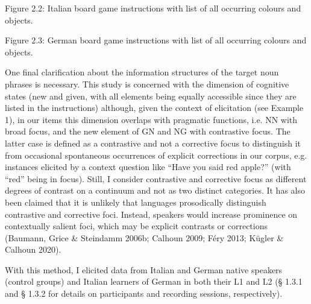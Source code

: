 \begin{stylecaption}
Figure 2.2: Italian board game instructions with list of all occurring colours and objects.
\end{stylecaption}

\begin{styleStandard}
  [Warning: Image ignored] %
 
\end{styleStandard}

\begin{stylecaption}
Figure 2.3: German board game instructions with list of all occurring colours and objects.
\end{stylecaption}

\begin{styleStandard}
One final clarification about the information structures of the target noun phrases is necessary. This study is concerned with the dimension of cognitive states (new and given, with all elements being equally accessible since they are listed in the instructions) although, given the context of elicitation (see Example 1), in our items this dimension overlaps with pragmatic functions, i.e. NN with broad focus, and the new element of GN and NG with contrastive focus. The latter case is defined as a contrastive and not a corrective focus to distinguish it from occasional spontaneous occurrences of explicit corrections in our corpus, e.g. instances elicited by a context question like “Have you said red apple?” (with “red” being in focus). Still, I consider contrastive and corrective focus as different degrees of contrast on a continuum and not as two distinct categories. It has also been claimed that it is unlikely that languages prosodically distinguish contrastive and corrective foci. Instead, speakers would increase prominence on contextually salient foci, which may be explicit contrasts or corrections (Baumann, Grice \& Steindamm 2006b; Calhoun 2009; Féry 2013; Kügler \& Calhoun 2020).
\end{styleStandard}

\begin{styleStandard}
With this method, I elicited data from Italian and German native speakers (control groups) and Italian learners of German in both their L1 and L2 (§ 1.3.1 and § 1.3.2 for details on participants and recording sessions, respectively).
\end{styleStandard}

